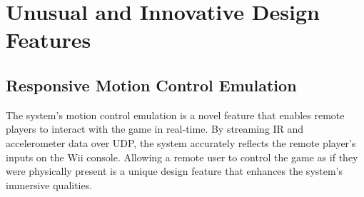 




\section{Unusual and Innovative Design Features}

\subsection{Responsive Motion Control Emulation}
The system’s motion control emulation is a novel feature that enables remote players to interact with the game in real-time. By streaming IR and accelerometer data over UDP, the system accurately reflects the remote player’s inputs on the Wii console. Allowing a remote user to control the game as if they were physically present is a unique design feature that enhances the system’s immersive qualities.

